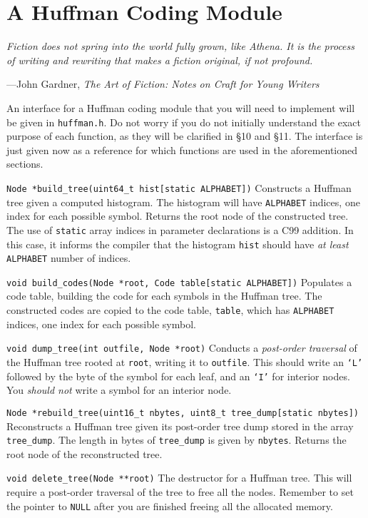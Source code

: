 \section{A Huffman Coding Module}
\textwidth
\epigraph{\emph{Fiction does not spring into the world fully grown, like Athena. It is the process of writing and rewriting that makes a fiction original, if not profound.}}
{---John Gardner, \emph{The Art of Fiction: Notes on Craft for Young Writers}}

An interface for a Huffman coding module that you will need to implement
will be given in \texttt{huffman.h}. Do not worry if you do not
initially understand the exact purpose of each function, as they will be
clarified in \S 10 and \S 11. The interface is just given now as a
reference for which functions are used in the aforementioned sections.

\begin{funcdoc}{\texttt{Node *build\_tree(uint64\_t hist[static ALPHABET])}}
  Constructs a Huffman tree given a computed histogram. The histogram
  will have \texttt{ALPHABET} indices, one index for each possible
  symbol. Returns the root node of the constructed tree. The use of
  \texttt{static} array indices in parameter declarations is a C99
  addition. In this case, it informs the compiler that the histogram
  \texttt{hist} should have \emph{at least} \texttt{ALPHABET} number of
  indices.
\end{funcdoc}

\begin{funcdoc}{\texttt{void build\_codes(Node *root, Code table[static ALPHABET])}}
  Populates a code table, building the code for each symbols in the
  Huffman tree. The constructed codes are copied to the code table,
  \texttt{table}, which has \texttt{ALPHABET} indices, one index for
  each possible symbol.
\end{funcdoc}

\begin{funcdoc}{\texttt{void dump\_tree(int outfile, Node *root)}}
  Conducts a \emph{post-order traversal} of the Huffman tree rooted at
  \texttt{root}, writing it to \texttt{outfile}. This should write an
  \texttt{`L'} followed by the byte of the symbol for each leaf, and an
  \texttt{`I'} for interior nodes. You \emph{should not} write a symbol
  for an interior node.
\end{funcdoc}

\begin{funcdoc}{\texttt{Node *rebuild\_tree(uint16\_t nbytes, uint8\_t tree\_dump[static nbytes])}}
  Reconstructs a Huffman tree given its post-order tree dump stored in
  the array \texttt{tree\_dump}. The length in bytes of
  \texttt{tree\_dump} is given by \texttt{nbytes}. Returns the root node
  of the reconstructed tree.
\end{funcdoc}

\begin{funcdoc}{\texttt{void delete\_tree(Node **root)}}
  The destructor for a Huffman tree. This will require a post-order
  traversal of the tree to free all the nodes. Remember to set the
  pointer to \texttt{NULL} after you are finished freeing all the
  allocated memory.
\end{funcdoc}
